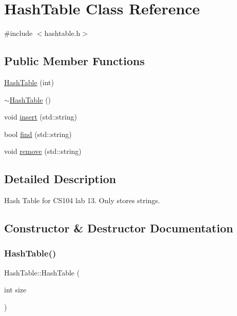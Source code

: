 \hypertarget{class_hash_table}{}\section{Hash\+Table Class Reference}
\label{class_hash_table}


{\ttfamily \#include $<$hashtable.\+h$>$}

\subsection*{Public Member Functions}
\begin{DoxyCompactItemize}
\item 
\mbox{\hyperlink{class_hash_table_a655be4719731689e0083bfd914e3a830}{Hash\+Table}} (int)
\item 
\mbox{\hyperlink{class_hash_table_a9ce5569bb945880cacb29aaba6f3e3f9}{$\sim$\+Hash\+Table}} ()
\item 
void \mbox{\hyperlink{class_hash_table_aeedf096a6ec56507c0ff33fd945793ea}{insert}} (std\+::string)
\item 
bool \mbox{\hyperlink{class_hash_table_aa53511e44d432ab84f2cb0c8cd9b4c5c}{find}} (std\+::string)
\item 
void \mbox{\hyperlink{class_hash_table_ab694b19c12f60a867a63b5e694762f01}{remove}} (std\+::string)
\end{DoxyCompactItemize}


\subsection{Detailed Description}
Hash Table for C\+S104 lab 13. Only stores strings. 

\subsection{Constructor \& Destructor Documentation}
\mbox{\label{class_hash_table_a655be4719731689e0083bfd914e3a830}} 
\subsubsection{\texorpdfstring{Hash\+Table()}{HashTable()}}
{\footnotesize\ttfamily Hash\+Table\+::\+Hash\+Table (\begin{DoxyParamCaption}\item[{int}]{size }\end{DoxyParamCaption})}

